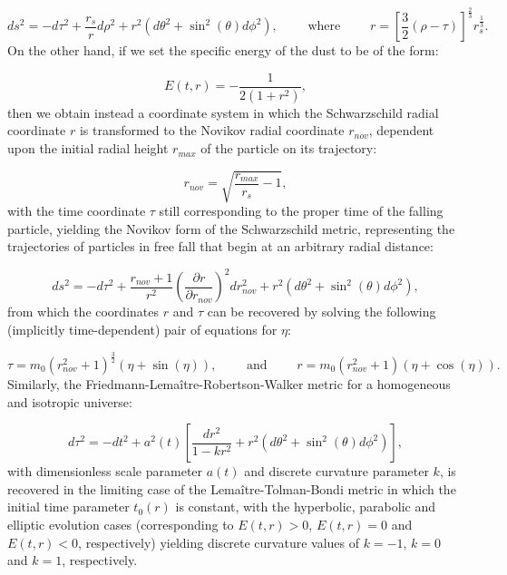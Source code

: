 \documentclass{article}
\begin{document}
\begin{equation}
ds^2 = - d \tau^2 + \frac{r_s}{r} d \rho^2 + r^2 \left( d \theta^2 + \sin^2 \left( \theta \right) d \phi^2 \right), \qquad \text{ where } \qquad r = \left[ \frac{3}{2} \left( \rho - \tau \right) \right]^{\frac{2}{3}} r_{s}^{\frac{1}{3}}.
\end{equation}
On the other hand, if we set the specific energy of the dust to be of the form:

\begin{equation}
E \left( t, r \right) = - \frac{1}{2 \left( 1 + r^2 \right)},
\end{equation}
then we obtain instead a coordinate system in which the Schwarzschild radial coordinate $r$ is transformed to the Novikov radial coordinate ${r_{nov}}$, dependent upon the initial radial height ${r_{max}}$ of the particle on its trajectory:

\begin{equation}
r_{nov} = \sqrt{\frac{r_{max}}{r_s} - 1},
\end{equation}
with the time coordinate ${\tau}$ still corresponding to the proper time of the falling particle, yielding the Novikov form of the Schwarzschild metric, representing the trajectories of particles in free fall that begin at an arbitrary radial distance:

\begin{equation}
ds^2 = - d \tau^2 + \frac{r_{nov} + 1}{r^2} \left( \frac{\partial r}{\partial r_{nov}} \right)^2 d r_{nov}^2 + r^2 \left( d \theta^2 + \sin^2 \left( \theta \right) d \phi^2 \right),
\end{equation}
from which the coordinates $r$ and ${\tau}$ can be recovered by solving the following (implicitly time-dependent) pair of equations for ${\eta}$:

\begin{equation}
\tau = m_0 \left( r_{nov}^{2} + 1 \right)^{\frac{3}{2}} \left( \eta + \sin \left( \eta \right) \right), \qquad \text{ and } \qquad r = m_0 \left( r_{nov}^{2} + 1 \right) \left( \eta + \cos \left( \eta \right) \right).
\end{equation}
Similarly, the Friedmann-Lema\^itre-Robertson-Walker metric\cite{friedmann}\cite{lemaitre}\cite{robertson}\cite{walker} for a homogeneous and isotropic universe:

\begin{equation}
d \tau^2 = - dt^2 + a^2 \left( t \right) \left[ \frac{dr^2}{1 - kr^2} + r^2 \left( d \theta^2 + \sin^2 \left( \theta \right) d \phi^2 \right) \right],
\end{equation}
with dimensionless scale parameter ${a \left( t \right)}$ and discrete curvature parameter $k$, is recovered in the limiting case of the Lema\^itre-Tolman-Bondi metric in which the initial time parameter ${t_0 \left( r \right)}$ is constant, with the hyperbolic, parabolic and elliptic evolution cases (corresponding to ${E \left( t, r \right) > 0}$, ${E \left( t, r \right) = 0}$ and ${E \left( t, r \right) < 0}$, respectively) yielding discrete curvature values of ${k = -1}$, ${k = 0}$ and ${k = 1}$, respectively.
\end{document}
